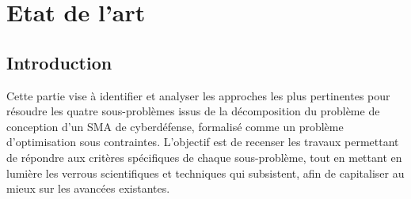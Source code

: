 \clearpage
\thispagestyle{empty}
\null
\newpage

\cleardoublepage
{}
\part{Etat de l'art}
\label{part:etat_art}

\clearpage
\thispagestyle{empty}
\null
\newpage


\chapter*{Introduction}

\noindent
Cette partie vise à identifier et analyser les approches les plus pertinentes pour résoudre les quatre sous-problèmes issus de la décomposition du problème de conception d’un SMA de cyberdéfense, formalisé comme un problème d’optimisation sous contraintes. L’objectif est de recenser les travaux permettant de répondre aux critères spécifiques de chaque sous-problème, tout en mettant en lumière les verrous scientifiques et techniques qui subsistent, afin de capitaliser au mieux sur les avancées existantes.

